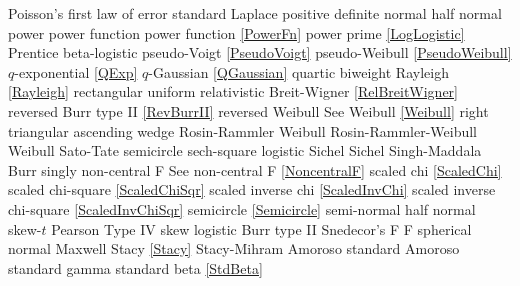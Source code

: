Poisson's first law of error			\dotfill	standard Laplace					\ncite	%
positive definite normal 			\dotfill	half normal 						\ncite 	%
power						\dotfill	power function 						\ncite	%
power function					\dotfill	\eqref{PowerFn}					\ncite	%
power prime					\dotfill	\eqref{LogLogistic}					\mcite{\self}
Prentice 						\dotfill	beta-logistic							
pseudo-Voigt					\dotfill	\eqref{PseudoVoigt}					\ncite
pseudo-Weibull					\dotfill	\eqref{PseudoWeibull}				\ncite	%
%
$q$-exponential				\dotfill	\eqref{QExp}						\ncite	%
$q$-Gaussian					\dotfill	\eqref{QGaussian}					\ncite	%
quartic						\dotfill	biweight							\ncite
%
Rayleigh  						\dotfill	\eqref{Rayleigh}					\ncite	%
rectangular					\dotfill	uniform 							\ncite	%
relativistic Breit-Wigner			\dotfill	\eqref{RelBreitWigner}				\ncite	%
reversed Burr type II				\dotfill	\eqref{RevBurrII} 					\ncite	%
reversed Weibull				\dotfill	See Weibull \eqref{Weibull}			\ncite	%
right triangular					\dotfill	ascending wedge 					\ncite	%
Rosin-Rammler 				\dotfill	Weibull							   		%
Rosin-Rammler-Weibull 			\dotfill	Weibull							\ncite	%
%
Sato-Tate						\dotfill	semicircle 						\ncite	%
sech-square 					\dotfill	logistic							\ncite	%
Sichel						\dotfill	Sichel							\ncite	
Singh-Maddala 					\dotfill	Burr 								\ncite	%
singly non-central F       			 \dotfill	See non-central F  \eqref{NoncentralF}	\ncite 
scaled chi						\dotfill	\eqref{ScaledChi}					\ncite	%
scaled chi-square 				\dotfill	\eqref{ScaledChiSqr}					\ncite	%
scaled inverse chi 				\dotfill	\eqref{ScaledInvChi}					\ncite	%
scaled inverse chi-square 			\dotfill	\eqref{ScaledInvChiSqr}				 	%
semicircle						\dotfill	\eqref{Semicircle}					\ncite	%
semi-normal 					\dotfill	half normal 						\ncite	%
skew-$t$						\dotfill	Pearson Type IV 					\ncite	%
skew logistic					\dotfill	Burr type II 						\ncite	%
Snedecor's F  					\dotfill	F 								\ncite	%
spherical normal				\dotfill	Maxwell							\ncite	%
Stacy 						\dotfill	\eqref{Stacy} 						\ncite	%
Stacy-Mihram					\dotfill	Amoroso							\ncite	%
standard Amoroso				\dotfill	standard gamma 					\ncite	%
standard beta					\dotfill	\eqref{StdBeta} 					\ncite	%

